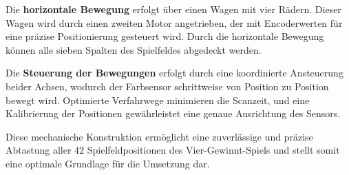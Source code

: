 Die \textbf{horizontale Bewegung} erfolgt über einen Wagen mit vier Rädern. Dieser Wagen wird durch einen zweiten Motor angetrieben, der mit Encoderwerten für eine präzise Positionierung gesteuert wird. Durch die horizontale Bewegung können alle sieben Spalten des Spielfeldes abgedeckt werden.

Die \textbf{Steuerung der Bewegungen} erfolgt durch eine koordinierte Ansteuerung beider Achsen, wodurch der Farbsensor schrittweise von Position zu Position bewegt wird. Optimierte Verfahrwege minimieren die Scanzeit, und eine Kalibrierung der Positionen gewährleistet eine genaue Ausrichtung des Sensors.

Diese mechanische Konstruktion ermöglicht eine zuverlässige und präzise Abtastung aller 42 Spielfeldpositionen des Vier-Gewinnt-Spiels und stellt somit eine optimale Grundlage für die Umsetzung  dar.
